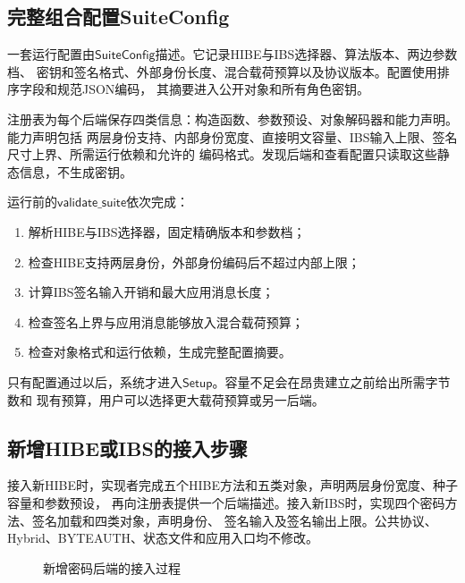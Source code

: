 \subsection{完整组合配置SuiteConfig}

一套运行配置由$\mathsf{SuiteConfig}$描述。它记录HIBE与IBS选择器、算法版本、两边参数档、
密钥和签名格式、外部身份长度、混合载荷预算以及协议版本。配置使用排序字段和规范JSON编码，
其摘要进入公开对象和所有角色密钥。

注册表为每个后端保存四类信息：构造函数、参数预设、对象解码器和能力声明。能力声明包括
两层身份支持、内部身份宽度、直接明文容量、IBS输入上限、签名尺寸上界、所需运行依赖和允许的
编码格式。发现后端和查看配置只读取这些静态信息，不生成密钥。

运行前的$\mathsf{validate\_suite}$依次完成：
\begin{enumerate}
  \item 解析HIBE与IBS选择器，固定精确版本和参数档；
  \item 检查HIBE支持两层身份，外部身份编码后不超过内部上限；
  \item 计算IBS签名输入开销和最大应用消息长度；
  \item 检查签名上界与应用消息能够放入混合载荷预算；
  \item 检查对象格式和运行依赖，生成完整配置摘要。
\end{enumerate}
只有配置通过以后，系统才进入$\mathsf{Setup}$。容量不足会在昂贵建立之前给出所需字节数和
现有预算，用户可以选择更大载荷预算或另一后端。

\subsection{新增HIBE或IBS的接入步骤}

接入新HIBE时，实现者完成五个HIBE方法和五类对象，声明两层身份宽度、种子容量和参数预设，
再向注册表提供一个后端描述。接入新IBS时，实现四个密码方法、签名加载和四类对象，声明身份、
签名输入及签名输出上限。公共协议、Hybrid、BYTEAUTH、状态文件和应用入口均不修改。

\begin{figure}[H]
\centering
{}
\caption{新增密码后端的接入过程}
\label{fig:new-backend}
\end{figure}

